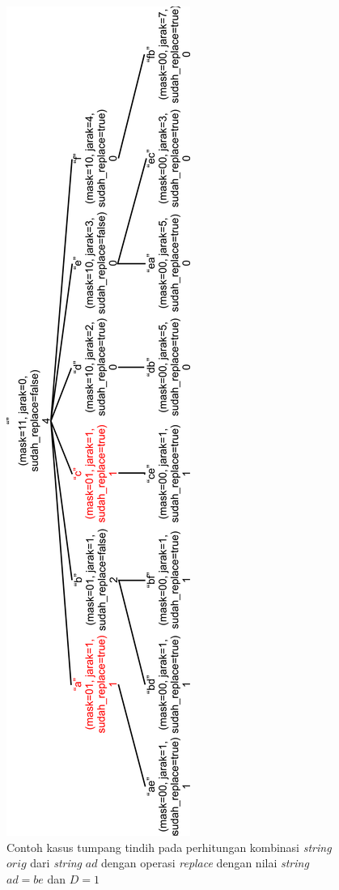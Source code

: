 \begin{figure}
	\centerline{ \includegraphics[scale=0.25]{assets/images/new/jpg/subproblem2-overlapping-rotated.jpg}}
	\caption{Contoh kasus tumpang tindih pada perhitungan kombinasi \textit{string} $ orig $ dari \textit{string} $ ad $ dengan operasi \textit{replace} dengan nilai \textit{string} $ ad=be $ dan $ D=1 $}
	\label{figure:contoh_kasus_tumpang_tindih_2}
\end{figure}

